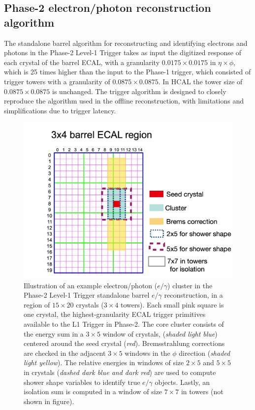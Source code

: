 \subsection{Phase-2 electron/photon reconstruction algorithm}
\label{section:phase-2-egamma-reconstruction-algorithm}

The standalone barrel algorithm for reconstructing and identifying electrons and photons in the Phase-2 Level-1 Trigger takes as input the digitized response of each crystal of the barrel ECAL, with a granularity $0.0175 \times 0.0175$ in $\eta \times \phi$, which is 25 times higher than the input to the Phase-1 trigger, which consisted of trigger towers with a granularity of $0.0875 \times 0.0875$. In HCAL the tower size of $0.0875 \times 0.0875$ is unchanged. The trigger algorithm is designed to closely reproduce the algorithm used in the offline reconstruction, with limitations and simplifications due to trigger latency. 

\begin{figure}[ht]
    \centering
    \includegraphics[width=12cm]{figures/ch-4-phase2/phase-2-cluster-footprint.png}
    \caption{Illustration of an example electron/photon ($e/\gamma$) cluster in the Phase-2 Level-1 Trigger standalone barrel $e/\gamma$ reconstruction, in a region of $15\times 20$ crystals ($3\times 4$ towers). Each small pink square is one crystal, the highest-granularity ECAL trigger primitives available to the L1 Trigger in Phase-2. The core cluster consists of the energy sum in a $3\times 5$ window of crystals, (\textit{shaded light blue}) centered around the seed crystal (\textit{red}). Bremsstrahlung corrections are checked in the adjacent $3\times 5$ windows in the $\phi$ direction (\textit{shaded light yellow}). The relative energies in windows of size $2\times 5$ and $5\times 5$ in crystals (\textit{dashed dark blue and dark red}) are used to compute shower shape variables to identify true $e/\gamma$ objects. Lastly, an isolation sum is computed in a window of size $7\times 7$ in towers (not shown in figure).}
    \label{fig:phase-2-cluster-footprint}
\end{figure}


